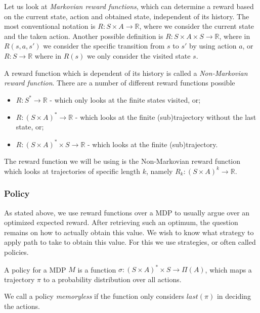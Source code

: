 Let us look at \textit{Markovian reward functions}, which can determine a reward based on the current state, action and obtained state, independent of its history. The most conventional notation is $R:S\times A\to \mathbb{R}$, where we consider the current state and the taken action. Another possible definition is $R:S\times A\times S\to\mathbb{R}$, where  in $R(s,a,s')$ we consider the specific transition from $s$ to $s'$ by using action $a$, or $R:S\to\mathbb{R}$ where in $R(s)$ we only consider the visited state $s$. 


A reward function which is dependent of its history is called a \textit{Non-Markovian reward function}. There are a number of different reward functions possible
\begin{itemize}
	\item $R:S^*\to\mathbb{R}$ - which only looks at the finite states visited, or;
	\item $R:(S\times A)^*\to\mathbb{R}$ - which looks at the finite (sub)trajectory without the last state, or;
	\item $R:(S\times A)^*\times S\to \mathbb{R}$ - which looks at the finite (sub)trajectory.
\end{itemize}

The reward function we will be using is the Non-Markovian reward function which looks at trajectories of specific length $k$, namely $R_k:(S\times A)^k\to\mathbb{R}$. 



\subsubsection*{Policy}
As stated above, we use reward functions over a MDP to usually argue over an optimized expected reward. After retrieving such an optimum, the question remains on how to actually obtain this value. We wish to know what strategy to apply path to take to obtain this value. For this we use strategies, or often called policies. 

\begin{definition}
	A policy for a MDP $M$ is a function $\sigma:(S\times A)^*\times S \to \Pi(A)$, which maps a trajectory $\pi$ to a probability distribution over all actions. 
\end{definition}

We call a policy \textit{memoryless} if the function only considers $last(\pi)$ in deciding the actions. 

